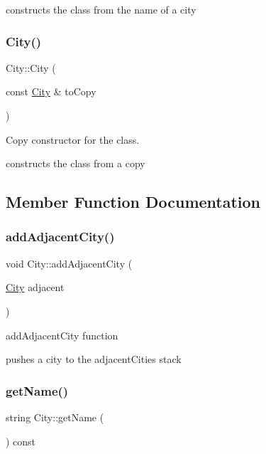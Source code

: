 constructs the class from the name of a city \hypertarget{class_city_a2401eee13bc31fb10f4236790c7ecb03}{}\label{class_city_a2401eee13bc31fb10f4236790c7ecb03} 
\subsubsection{\texorpdfstring{City()}{City()}\hspace{0.1cm}{\footnotesize\ttfamily [3/3]}}
{\footnotesize\ttfamily City\+::\+City (\begin{DoxyParamCaption}\item[{const \hyperlink{class_city}{City} \&}]{to\+Copy }\end{DoxyParamCaption})}



Copy constructor for the class. 

constructs the class from a copy 

\subsection{Member Function Documentation}
\hypertarget{class_city_a14c86786f56c6653d8ad38db67e09c0d}{}\label{class_city_a14c86786f56c6653d8ad38db67e09c0d} 
\subsubsection{\texorpdfstring{add\+Adjacent\+City()}{addAdjacentCity()}}
{\footnotesize\ttfamily void City\+::add\+Adjacent\+City (\begin{DoxyParamCaption}\item[{\hyperlink{class_city}{City}}]{adjacent }\end{DoxyParamCaption})}



add\+Adjacent\+City function 

pushes a city to the adjacent\+Cities stack \hypertarget{class_city_a4843313c0238390843ae5760ec5b6561}{}\label{class_city_a4843313c0238390843ae5760ec5b6561} 
\subsubsection{\texorpdfstring{get\+Name()}{getName()}}
{\footnotesize\ttfamily string City\+::get\+Name (\begin{DoxyParamCaption}{ }\end{DoxyParamCaption}) const}



